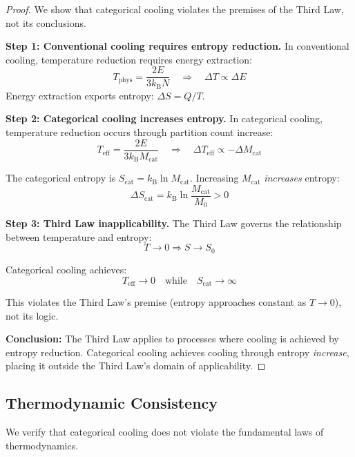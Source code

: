 \documentclass[twocolumn,10pt,twoside]{article}
\newcommand{\kb}{k_{\mathrm{B}}}
\newcommand{\Teff}{T_{\mathrm{eff}}}
\newcommand{\Tphys}{T_{\mathrm{phys}}}
\newcommand{\Mcat}{M_{\mathrm{cat}}}
\newcommand{\Scat}{S_{\mathrm{cat}}}
\begin{document}
\begin{proof}
We show that categorical cooling violates the premises of the Third Law, not its conclusions.

\textbf{Step 1: Conventional cooling requires entropy reduction.}
In conventional cooling, temperature reduction requires energy extraction:
\begin{equation}
\Tphys = \frac{2E}{3\kb N} \quad \Rightarrow \quad \Delta T \propto \Delta E
\end{equation}
Energy extraction exports entropy: $\Delta S = Q/T$.

\textbf{Step 2: Categorical cooling increases entropy.}
In categorical cooling, temperature reduction occurs through partition count increase:
\begin{equation}
\Teff = \frac{2E}{3\kb \Mcat} \quad \Rightarrow \quad \Delta \Teff \propto -\Delta \Mcat
\end{equation}

The categorical entropy is $\Scat = \kb \ln \Mcat$. Increasing $\Mcat$ \textit{increases} entropy:
\begin{equation}
\Delta \Scat = \kb \ln \frac{\Mcat}{M_0} > 0
\end{equation}

\textbf{Step 3: Third Law inapplicability.}
The Third Law governs the relationship between temperature and entropy:
\begin{equation}
T \to 0 \Rightarrow S \to S_0
\end{equation}

Categorical cooling achieves:
\begin{equation}
\Teff \to 0 \quad \text{while} \quad \Scat \to \infty
\end{equation}

This violates the Third Law's premise (entropy approaches constant as $T \to 0$), not its logic.

\textbf{Conclusion:} The Third Law applies to processes where cooling is achieved by entropy reduction. Categorical cooling achieves cooling through entropy \textit{increase}, placing it outside the Third Law's domain of applicability.
\end{proof}

\subsection{Thermodynamic Consistency}

We verify that categorical cooling does not violate the fundamental laws of thermodynamics.
\end{document}
